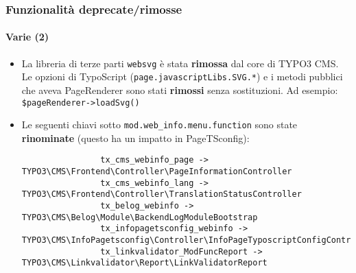 
\begin{frame}[fragile]
	\frametitle{Funzionalità deprecate/rimosse}
	\framesubtitle{Varie (2)}

	\lstset{basicstyle=\tiny\ttfamily}

	\begin{itemize}

		\item La libreria di terze parti \texttt{websvg} è stata \textbf{rimossa}
			dal core di TYPO3 CMS. Le opzioni di TypoScript
			(\texttt{page.javascriptLibs.SVG.*}) e i metodi pubblici che aveva
			PageRenderer sono stati \textbf{rimossi} senza sostituzioni.\newline
			Ad esempio: \texttt{\$pageRenderer->loadSvg()}

		\item Le seguenti chiavi sotto \texttt{mod.web\_info.menu.function}
			sono state \textbf{rinominate} (questo ha un impatto in PageTSconfig):

			\begin{lstlisting}
				tx_cms_webinfo_page -> TYPO3\CMS\Frontend\Controller\PageInformationController
				tx_cms_webinfo_lang -> TYPO3\CMS\Frontend\Controller\TranslationStatusController
				tx_belog_webinfo -> TYPO3\CMS\Belog\Module\BackendLogModuleBootstrap
				tx_infopagetsconfig_webinfo -> TYPO3\CMS\InfoPagetsconfig\Controller\InfoPageTyposcriptConfigController
				tx_linkvalidator_ModFuncReport -> TYPO3\CMS\Linkvalidator\Report\LinkValidatorReport
			\end{lstlisting}

	\end{itemize}

\end{frame}


